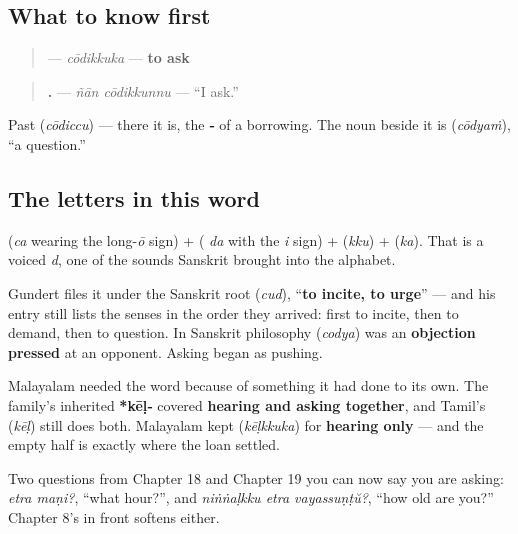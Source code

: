 \subsection*{What to know first}
\begin{quote}
\textbf{} — \emph{cōdikkuka} — \textbf{to ask}
\end{quote}

\begin{quote}
\textbf{ .} — \emph{ñān cōdikkunnu} — \textquotedblleft{}I ask.\textquotedblright{}
\end{quote}

Past \textbf{} (\emph{cōdiccu}) — there it is, the \textbf{‑} of a borrowing. The noun beside it is \textbf{} (\emph{cōdyaṁ}), \textquotedblleft{}a question.\textquotedblright{}

\subsection*{The letters in this word}
\textbf{} (\emph{ca} wearing the long-\emph{ō} sign) + \textbf{} (\textbf{} \emph{da} with the \emph{i} sign) + \textbf{} (\emph{kku}) + \textbf{} (\emph{ka}). That \textbf{} is a voiced \emph{d}, one of the sounds Sanskrit brought into the alphabet.

\begin{cousinweb}
Gundert files it under the Sanskrit root \textbf{} (\emph{cud}), \textquotedblleft{}\textbf{to incite, to urge}\textquotedblright{} — and his entry still lists the senses in the order they arrived: first to incite, then to demand, then to question. In Sanskrit philosophy \textbf{} (\emph{codya}) was an \textbf{objection pressed} at an opponent. Asking began as pushing.

Malayalam needed the word because of something it had done to its own. The family's inherited \textbf{*kēḷ‑} covered \textbf{hearing and asking together}, and Tamil's \textbf{} (\emph{kēḷ}) still does both. Malayalam kept \textbf{} (\emph{kēḷkkuka}) for \textbf{hearing only} — and the empty half is exactly where the loan settled.

Two questions from Chapter 18 and Chapter 19 you can now say you are asking: \emph{etra maṇi?}, \textquotedblleft{}what hour?\textquotedblright{}, and \emph{niṅṅaḷkku etra vayassuṇṭŭ?}, \textquotedblleft{}how old are you?\textquotedblright{} Chapter 8's \textbf{} in front softens either.
\end{cousinweb}

